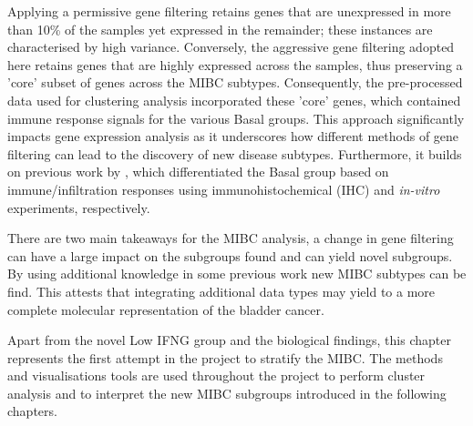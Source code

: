 Applying a permissive gene filtering retains genes that are unexpressed in more than 10\% of the samples yet expressed in the remainder; these instances are characterised by high variance. Conversely, the aggressive gene filtering adopted here retains genes that are highly expressed across the samples, thus preserving a 'core' subset of genes across the MIBC subtypes. Consequently, the pre-processed data used for clustering analysis incorporated these 'core' genes, which contained immune response signals for the various Basal groups. This approach significantly impacts gene expression analysis as it underscores how different methods of gene filtering can lead to the discovery of new disease subtypes. Furthermore, it builds on previous work by \citet{Marzouka2018-ge,Baker2022-bj}, which differentiated the Basal group based on immune/infiltration responses using immunohistochemical (IHC) and \textit{in-vitro} experiments, respectively.

There are two main takeaways for the MIBC analysis, a change in gene filtering can have a large impact on the subgroups found and can yield novel subgroups. By using additional knowledge in some previous work \citet{Marzouka2018-ge,Baker2022-bj} new MIBC subtypes can be find. This attests that integrating additional data types may yield to a more complete molecular representation of the bladder cancer.


Apart from the novel Low IFNG group and the biological findings, this chapter represents the first attempt in the project to stratify the MIBC. The methods and visualisations tools are used throughout the project to perform cluster analysis and to interpret the new MIBC subgroups introduced in the following chapters.

